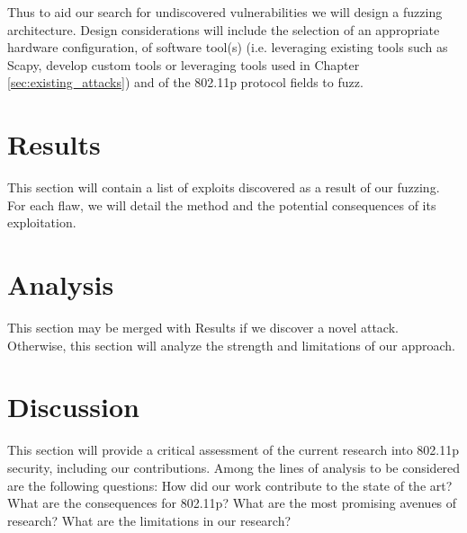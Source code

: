 \documentclass[conference]{IEEEtran}
\begin{document}
Thus to aid our search for undiscovered vulnerabilities we will design a fuzzing architecture. Design considerations will include the selection of an appropriate hardware configuration, of software tool(s) (i.e. leveraging existing tools such as Scapy, develop custom tools or leveraging tools used in Chapter \ref{sec:existing_attacks}) and of the 802.11p protocol fields to fuzz.

\section{Results}
This section will contain a list of exploits discovered as a result of our fuzzing. For each flaw, we will detail the method and the potential consequences of its exploitation.

\section{Analysis}
This section may be merged with Results if we discover a novel attack. Otherwise, this section will analyze the strength and limitations of our approach.

\section{Discussion}
This section will provide a critical assessment of the current research into 802.11p security, including our contributions. Among the lines of analysis to be considered are the following questions: How did our work contribute to the state of the art? What are the consequences for 802.11p? What are the most promising avenues of research? What are the limitations in our research?



\end{document}

